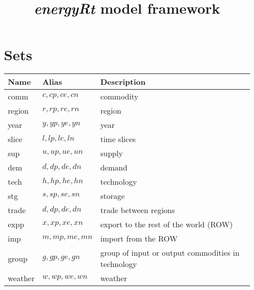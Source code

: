 \documentclass{article}
\title{\emph{energyRt} model framework}
\begin{document}
\maketitle
\section*{Sets}
\begin{longtable}{| l | l | l |}
\hline
\bf{Name} & \bf{Alias} & \bf{Description} \\ 
 \hline
comm & $c,cp,ce,cn$ & commodity \\ 
 \hline
region & $r,rp,re,rn$ & region \\ 
 \hline
year & $y,yp,ye,yn$ & year \\ 
 \hline
slice & $l,lp,le,ln$ & time slices \\ 
 \hline
sup & $u,up,ue,un$ & supply \\ 
 \hline
dem & $d,dp,de,dn$ & demand \\ 
 \hline
tech & $h,hp,he,hn$ & technology \\ 
 \hline
stg & $s,sp,se,sn$ & storage \\ 
 \hline
trade & $d,dp,de,dn$ & trade between regions \\ 
 \hline
expp & $x,xp,xe,xn$ & export to the rest of the world (ROW) \\ 
 \hline
imp & $m,mp,me,mn$ & import from the ROW \\ 
 \hline
group & $g,gp,ge,gn$ & group of input or output commodities in technology \\ 
 \hline
weather & $w,wp,we,wn$ & weather \\ 
 \hline
\end{longtable}
\end{document}
